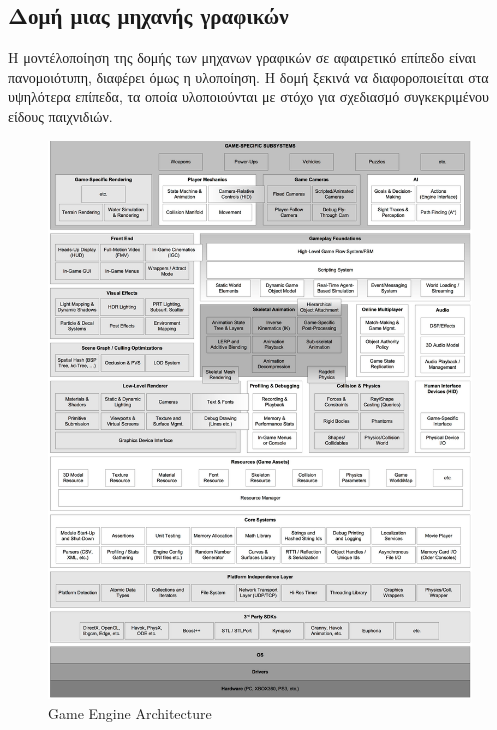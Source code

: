 \subsection{Δομή μιας μηχανής γραφικών}
Η μοντέλοποίηση της δομής των μηχανων γραφικών σε αφαιρετικό επίπεδο είναι πανομοιότυπη, διαφέρει όμως η υλοποίηση. Η δομή ξεκινά να διαφοροποιείται στα υψηλότερα επίπεδα, τα οποία υλοποιούνται με στόχο για σχεδιασμό συγκεκριμένου είδους παιχνιδιών.
	\begin{figure}
		\centering
		\includegraphics[width=160mm]{Images/game_engine_architecture}
		\caption{Game Engine Architecture}
		\label{fig:Game Engine Architecture}
	\end{figure}	

